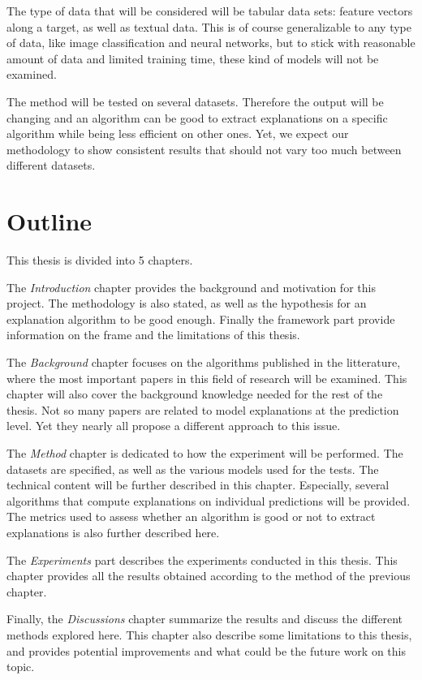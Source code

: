 \documentclass[a4paper,11pt]{kth-mag}
\begin{document}
The type of data that will be considered will be tabular data sets: feature vectors along a target, as well as textual data. This is of course generalizable to any type of data, like image classification and neural networks, but to stick with reasonable amount of data and limited training time, these kind of models will not be examined.

The method will be tested on several datasets. Therefore the output will be changing and an algorithm can be good to extract explanations on a specific algorithm while being less efficient on other ones. Yet, we expect our methodology to show consistent results that should not vary too much between different datasets.

\section{Outline}

This thesis is divided into 5 chapters.

The \textit{Introduction} chapter provides the background and motivation for this project. The methodology is also stated, as well as the hypothesis for an explanation algorithm to be good enough. Finally the framework part provide information on the frame and the limitations of this thesis.

The \textit{Background} chapter focuses on the algorithms published in the litterature, where the most important papers in this field of research will be examined. This chapter will also cover the background knowledge needed for the rest of the thesis. Not so many papers are related to model explanations at the prediction level. Yet they nearly all propose a different approach to this issue.

The \textit{Method} chapter is dedicated to how the experiment will be performed. The datasets are specified, as well as the various models used for the tests. The technical content will be further described in this chapter. Especially, several algorithms that compute explanations on individual predictions will be provided. The metrics used to assess whether an algorithm is good or not to extract explanations is also further described here.

The \textit{Experiments} part describes the experiments conducted in this thesis. This chapter provides all the results obtained according to the method of the previous chapter.

Finally, the \textit{Discussions} chapter summarize the results and discuss the different methods explored here. This chapter also describe some limitations to this thesis, and provides potential improvements and what could be the future work on this topic.
\end{document}
